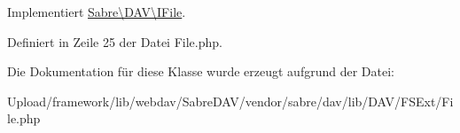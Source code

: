 Implementiert \mbox{\hyperlink{interface_sabre_1_1_d_a_v_1_1_i_file_a0c30bc87b22d289f311c854f23993452}{Sabre\textbackslash{}\+D\+A\+V\textbackslash{}\+I\+File}}.



Definiert in Zeile 25 der Datei File.\+php.



Die Dokumentation für diese Klasse wurde erzeugt aufgrund der Datei\+:\begin{DoxyCompactItemize}
\item 
Upload/framework/lib/webdav/\+Sabre\+D\+A\+V/vendor/sabre/dav/lib/\+D\+A\+V/\+F\+S\+Ext/File.\+php\end{DoxyCompactItemize}
